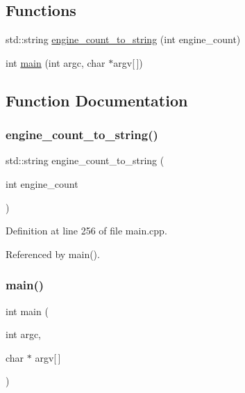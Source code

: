 \subsection*{Functions}
\begin{DoxyCompactItemize}
\item 
std\+::string \hyperlink{hand-tracking_2src_2main_8cpp_ae7defd726cf4a6ff613e0eba03121301}{engine\+\_\+count\+\_\+to\+\_\+string} (int engine\+\_\+count)
\item 
int \hyperlink{hand-tracking_2src_2main_8cpp_a0ddf1224851353fc92bfbff6f499fa97}{main} (int argc, char $\ast$argv\mbox{[}$\,$\mbox{]})
\end{DoxyCompactItemize}


\subsection{Function Documentation}
\mbox{\label{hand-tracking_2src_2main_8cpp_ae7defd726cf4a6ff613e0eba03121301}} 
\subsubsection{\texorpdfstring{engine\+\_\+count\+\_\+to\+\_\+string()}{engine\_count\_to\_string()}}
{\footnotesize\ttfamily std\+::string engine\+\_\+count\+\_\+to\+\_\+string (\begin{DoxyParamCaption}\item[{int}]{engine\+\_\+count }\end{DoxyParamCaption})}



Definition at line 256 of file main.\+cpp.



Referenced by main().

\mbox{\label{hand-tracking_2src_2main_8cpp_a0ddf1224851353fc92bfbff6f499fa97}} 
\subsubsection{\texorpdfstring{main()}{main()}}
{\footnotesize\ttfamily int main (\begin{DoxyParamCaption}\item[{int}]{argc,  }\item[{char $\ast$}]{argv\mbox{[}$\,$\mbox{]} }\end{DoxyParamCaption})}



